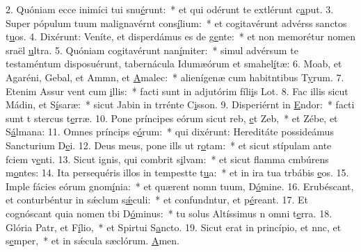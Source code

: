 2. Quóniam ecce inimíci tui snu\uline{é}runt:~* et qui odérunt te extlérunt c\uline{a}put.
3. Super pópulum tuum malignavérnt cons\uline{í}lium:~* et cogitavérunt advérss sanctos t\uline{u}os.
4. Dixérunt: Veníte, et disperdámus es de g\uline{e}nte:~* et non memorétur nomen sraël \uline{u}ltra.
5. Quóniam cogitavérunt nan\uline{í}miter:~* simul advérsum te testaméntum disposuérunt, tabernácula Idumæórum et smahel\uline{í}tæ:
6. Moab, et Agaréni, Gebal, et Ammn, et \uline{A}malec:~* alienígenæ cum habitntibus T\uline{y}rum.
7. Etenim Assur vent cum \uline{i}llis:~* facti sunt in adjutórim fíli\uline{i}s Lot.
8. Fac illis sicut Mádin, et S\uline{í}saræ:~* sicut Jabin in trrénte C\uline{i}sson.
9. Disperiérnt in \uline{E}ndor:~* facti sunt t stercus t\uline{e}rræ.
10. Pone príncipes eórum sicut reb, \uline{e}t Zeb,~* et Zébe, et S\uline{á}lmana:
11. Omnes príncips e\uline{ó}rum:~* qui dixérunt: Hereditáte possideámus Sancturium D\uline{e}i.
12. Deus meus, pone ills ut r\uline{o}tam:~* et sicut stípulam ante fciem v\uline{e}nti.
13. Sicut ignis, qui combrit s\uline{i}lvam:~* et sicut flamma cmbúrens m\uline{o}ntes:
14. Ita persequéris illos in tempestte t\uline{u}a:~* et in ira tua trbábis \uline{e}os.
15. Imple fácies eórum gnom\uline{í}nia:~* et quærent nomn tuum, D\uline{ó}mine.
16. Erubéscant, et conturbéntur in sǽclum s\uline{ǽ}culi:~* et confundntur, et p\uline{é}reant.
17. Et cognóscant quia nomen tbi D\uline{ó}minus:~* tu solus Altíssimus n omni t\uline{e}rra.
18. Glória Patr, et F\uline{í}lio,~* et Spirtui S\uline{a}ncto.
19. Sicut erat in princípio, et nnc, et s\uline{e}mper,~* et in sǽcula sæclórum. \uline{A}men.
